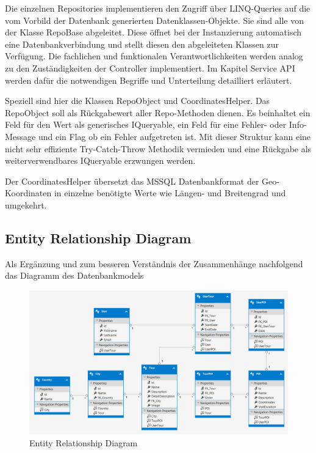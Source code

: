 \documentclass[a4paper,10pt,xetex]{article}
\begin{document}
  Die einzelnen Repositories implementieren den Zugriff \"uber LINQ-Queries auf die vom Vorbild der Datenbank generierten
  Datenklassen\--Objekte. Sie sind alle von der Klasse RepoBase abgeleitet. Diese \"offnet bei der Instanzierung
  automatisch eine Datenbankverbindung und stellt diesen den abgeleiteten Klassen zur Verf\"ugung. Die fachlichen und
  funktionalen Verantwortlichkeiten werden analog zu den Zust\"andigkeiten der Controller implementiert. Im Kapitel
  Service API werden daf\"ur die notwendigen Begriffe und Unterteilung detailliert erl\"autert.

  Speziell sind hier die Klassen RepoObject und CoordinatesHelper. Das RepoObject soll als R\"uckgabewert aller
  Repo-Methoden dienen. Es beinhaltet ein Feld f\"ur den Wert als generisches IQueryable, ein Feld f\"ur eine Fehler-
  oder Info-Message und ein Flag ob ein Fehler aufgetreten ist. Mit dieser Struktur kann eine nicht sehr effiziente
  Try-Catch-Throw Methodik vermieden und eine R\"uckgabe als weiterverwendbares IQueryable erzwungen werden.


  Der CoordinatesHelper \"ubersetzt das MSSQL Datenbankformat der Geo-Koordinaten in einzelne ben\"otigte Werte wie
  L\"angen- und Breitengrad und umgekehrt.

\subsection{Entity Relationship Diagram}\label{erm}

  Als Erg\"anzung und zum besseren Verst\"andnis der Zusammenh\"ange nachfolgend das Diagramm des Datenbankmodels

\begin{figure}
  \centering
  \includegraphics{erm}
  \caption{Entity Relationship Diagram}
\end{figure}
\end{document}
